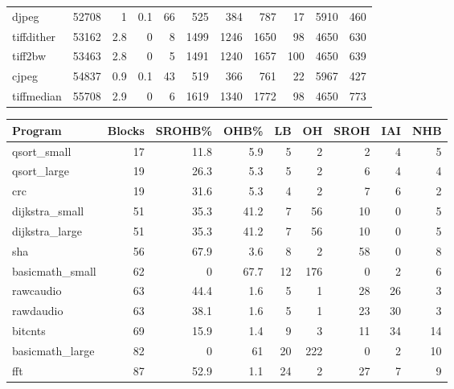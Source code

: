 \begin{tabular}{lrrrrrrrrrr}
 djpeg           &          52708 &      1   &    0.1 &   66 &    525 &        384 &          787 &    17 &  5910 &   460 \\
 tiffdither      &          53162 &      2.8 &    0   &    8 &   1499 &       1246 &         1650 &    98 &  4650 &   630 \\
 tiff2bw         &          53463 &      2.8 &    0   &    5 &   1491 &       1240 &         1657 &   100 &  4650 &   639 \\
 cjpeg           &          54837 &      0.9 &    0.1 &   43 &    519 &        366 &          761 &    22 &  5967 &   427 \\
 tiffmedian      &          55708 &      2.9 &    0   &    6 &   1619 &       1340 &         1772 &    98 &  4650 &   773 \\
\hline
\end{tabular}\begin{tabular}{lrrrrrrrr}
\hline
 Program         &   Blocks &   SROHB\% &   OHB\% &   LB &   OH &   SROH &   IAI &   NHB \\
\hline
 qsort\_small     &       17 &     11.8 &    5.9 &    5 &    2 &      2 &     4 &     5 \\
 qsort\_large     &       19 &     26.3 &    5.3 &    5 &    2 &      6 &     4 &     4 \\
 crc             &       19 &     31.6 &    5.3 &    4 &    2 &      7 &     6 &     2 \\
 dijkstra\_small  &       51 &     35.3 &   41.2 &    7 &   56 &     10 &     0 &     5 \\
 dijkstra\_large  &       51 &     35.3 &   41.2 &    7 &   56 &     10 &     0 &     5 \\
 sha             &       56 &     67.9 &    3.6 &    8 &    2 &     58 &     0 &     8 \\
 basicmath\_small &       62 &      0   &   67.7 &   12 &  176 &      0 &     2 &     6 \\
 rawcaudio       &       63 &     44.4 &    1.6 &    5 &    1 &     28 &    26 &     3 \\
 rawdaudio       &       63 &     38.1 &    1.6 &    5 &    1 &     23 &    30 &     3 \\
 bitcnts         &       69 &     15.9 &    1.4 &    9 &    3 &     11 &    34 &    14 \\
 basicmath\_large &       82 &      0   &   61   &   20 &  222 &      0 &     2 &    10 \\
 fft             &       87 &     52.9 &    1.1 &   24 &    2 &     27 &     7 &     9 \\

\end{tabular}
